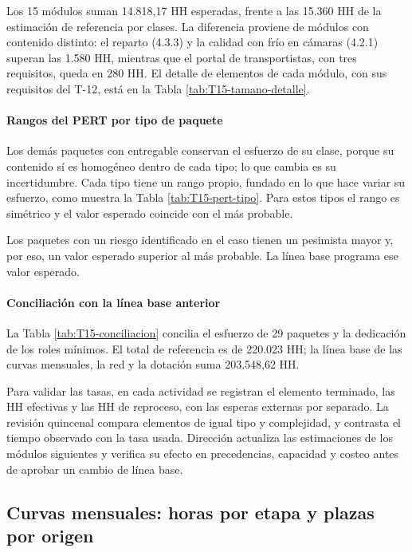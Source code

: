 Los 15 módulos suman 14.818,17 HH esperadas, frente a las 15.360 HH de la estimación de referencia por clases. La diferencia proviene de módulos con contenido distinto: el reparto (4.3.3) y la calidad con frío en cámaras (4.2.1) superan las 1.580 HH, mientras que el portal de transportistas, con tres requisitos, queda en 280 HH. El detalle de elementos de cada módulo, con sus requisitos del T-12, está en la Tabla \ref{tab:T15-tamano-detalle}.


\paragraph{Rangos del PERT por tipo de paquete}
Los demás paquetes con entregable conservan el esfuerzo de su clase, porque su contenido sí es homogéneo dentro de cada tipo; lo que cambia es su incertidumbre. Cada tipo tiene un rango propio, fundado en lo que hace variar su esfuerzo, como muestra la Tabla \ref{tab:T15-pert-tipo}. Para estos tipos el rango es simétrico y el valor esperado coincide con el más probable.


Los paquetes con un riesgo identificado en el caso tienen un pesimista mayor y, por eso, un valor esperado superior al más probable. La línea base programa ese valor esperado.


\paragraph{Conciliación con la línea base anterior}
La Tabla \ref{tab:T15-conciliacion} concilia el esfuerzo de 29 paquetes y la dedicación de los roles mínimos. El total de referencia es de 220.023 HH; la línea base de las curvas mensuales, la red y la dotación suma 203.548,62 HH.


Para validar las tasas, en cada actividad se registran el elemento terminado, las HH efectivas y las HH de reproceso, con las esperas externas por separado. La revisión quincenal compara elementos de igual tipo y complejidad, y contrasta el tiempo observado con la tasa usada. Dirección actualiza las estimaciones de los módulos siguientes y verifica su efecto en precedencias, capacidad y costeo antes de aprobar un cambio de línea base.


\subsection{Curvas mensuales: horas por etapa y plazas por origen}

